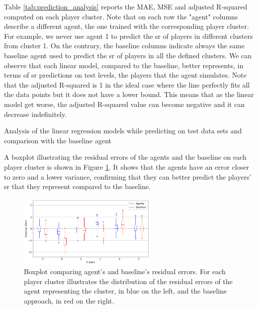 Table \ref{tab:prediction_analysis} reports the MAE, MSE and adjusted R-squared computed on each player cluster. Note that on each row the "agent" columns describe a different agent, the one trained with the corresponding player cluster. For example, we never use agent 1 to predict the \acs{sr} of players in different clusters from cluster 1. On the contrary, the baseline columns indicate always the same baseline agent used to predict the \acs{sr} of players in all the defined clusters. We can observe that each linear model, compared to the baseline, better represents, in terms of \acs{sr} predictions on test levels, the players that the agent simulates. Note that the adjusted R-squared is 1 in the ideal case where the line perfectly fits all the data points but it does not have a lower bound. This means that as the linear model get worse, the adjusted R-squared value can become negative and it can decrease indefinitely.    
\begin{table}[H]
    \centering
    \small
    \caption{Analysis of the linear regression models while predicting on test data sets and comparison with the baseline agent} 
    
    \label{tab:prediction_analysis}
\end{table} 

A boxplot illustrating the residual errors of the agents and the baseline on each player cluster is shown in Figure \ref{fig:boxplot}. It shows that the agents have an error closer to zero and a lower variance, confirming that they can better predict the players' \acs{sr} that they represent compared to the baseline.
\begin{figure}[h!]       
    \centering
    \includegraphics[width=0.6\textwidth]{masters-thesis-master/masters-thesis/contents/04_results/Player_Modeling/Clustering/plots/boxplot.png}
    \caption{Boxplot comparing agent's and baseline's residual errors. For each player cluster illustrates the distribution of the residual errors of the agent representing the cluster, in blue on the left, and the baseline approach, in red on the right.}
    \label{fig:boxplot}
\end{figure}

